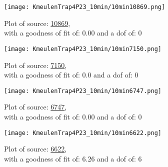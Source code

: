 \documentclass{article}
\begin{document}
\begin{figure}[H]
    \centering
    \begin{minipage}{.5\textwidth}
        \centering
        \texttt{[image: KmeulenTrap4P23\_10min/10min10869.png]}
        \captionsetup{labelformat=empty}
        \caption{Plot of source: \href{http://banana.transientskp.org/r4/vlo_KmeulenTrap4P23/runningcatalog/10869}{10869},\\with a goodness of fit of: 0.00 and a dof of: 0}
        \addtocounter{figure}{-1}
        \label{KmeulenTrap4P23:10min:10869:plot}
    \end{minipage}%
    \begin{minipage}{0.5\textwidth}
        \centering

        \texttt{[image: KmeulenTrap4P23\_10min/10min7150.png]}
        \captionsetup{labelformat=empty}
        \caption{Plot of source: \href{http://banana.transientskp.org/r4/vlo_KmeulenTrap4P23/runningcatalog/7150}{7150},\\with a goodness of fit of: 0.0 and a dof of: 0}
    \addtocounter{figure}{-1}
    \label{KmeulenTrap4P23:10min:7150:plot}
    \end{minipage}
\end{figure}
\begin{figure}[H]
    \centering
    \begin{minipage}{.5\textwidth}
        \centering
        \texttt{[image: KmeulenTrap4P23\_10min/10min6747.png]}
        \captionsetup{labelformat=empty}
        \caption{Plot of source: \href{http://banana.transientskp.org/r4/vlo_KmeulenTrap4P23/runningcatalog/6747}{6747},\\with a goodness of fit of: 0.00 and a dof of: 0}
        \addtocounter{figure}{-1}
        \label{KmeulenTrap4P23:10min:6747:plot}
    \end{minipage}%
    \begin{minipage}{0.5\textwidth}
        \centering

        \texttt{[image: KmeulenTrap4P23\_10min/10min6622.png]}
        \captionsetup{labelformat=empty}
        \caption{Plot of source: \href{http://banana.transientskp.org/r4/vlo_KmeulenTrap4P23/runningcatalog/6622}{6622},\\with a goodness of fit of: 6.26 and a dof of: 6}
    \addtocounter{figure}{-1}
    \label{KmeulenTrap4P23:10min:6622:plot}
    \end{minipage}
\end{figure}
\end{document}
